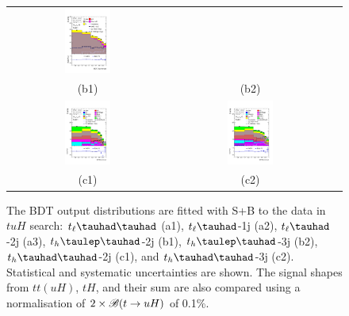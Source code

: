\begin{figure}[H]
\begin{tabular}{@{}ccc@{}}
\includegraphics[width=0.3\textwidth]{figures/tuH_reg1l1tau1b3j_os.pdf}&\\
(b1) & (b2)&   \\
\includegraphics[width=0.3\textwidth]{figures/tuH_reg2mtau1b2jos.pdf}&
\includegraphics[width=0.3\textwidth]{figures/tuH_reg2mtau1b3jos.pdf}& \\
(c1) & (c2)& \\
\end{tabular}
\caption{ The BDT output distributions are fitted with S+B to the data in $tuH$ search: $t_{\ell}\thadhad$ (a1),  $t_{\ell}\tauhad$-1j (a2),  $t_{\ell}\tauhad$-2j (a3),
  $t_h\tlhad$-2j (b1), $t_h\tlhad$-3j (b2), $t_h\thadhad$-2j (c1), and $t_h\thadhad$-3j (c2). Statistical and systematic uncertainties are shown. The signal shapes
  from $tt(uH)$, $tH$, and their sum are also compared using a normalisation of $2 \times\mathscr{B}(t\to uH)$ of 0.1\%. 
}
\label{fig:asimov_postfitbdtHu}
\end{figure}

